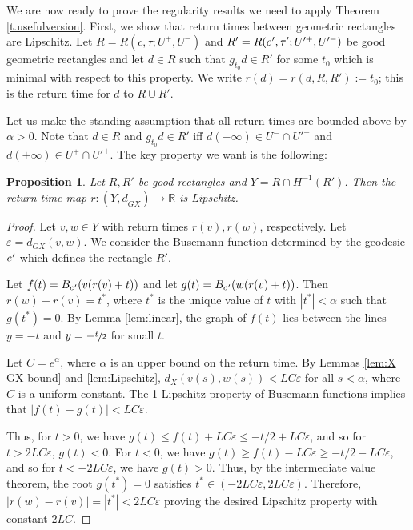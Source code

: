 \documentclass[11pt]{article}
\let\epsilon\varepsilon
\newcommand{\cpr}{c\mkern1mu'}
\newtheorem{prop}[thm]{Proposition}
\theoremstyle{definition}
\numberwithin{equation}{section}
\begin{document}
We are now ready to prove the regularity results we need to apply Theorem \ref{t.usefulversion}. First, we show that return times between geometric rectangles are Lipschitz. Let $R=R(c, \tau; U^+, U^-)$ and $R'=R(\cpr, \tau'; U'^+, U'^-)$ be good geometric rectangles and let $d\in R$ such that $g_{t_0}d \in R'$ for some $t_0$ which is minimal with respect to this property. We write $r(d)=r(d, R, R') :=t_0$; this is the return time for $d$ to $R \cup R'$.

Let us make the standing assumption that all return times are bounded above by $\alpha>0$. Note that $d\in R$ and $g_{t_0}d \in R'$ iff $d(-\infty)\in U^-\cap U'^-$ and $d(+\infty)\in U^+\cap U'^+$. The key property we want is the following:

\begin{prop}\label{prop:Lipschitz}
Let $R, R'$ be good rectangles and $Y= R \cap H^{-1}(R')$. Then the return time map $r:(Y, d_{G\tilde X}) \to \mathbb{R}$ is Lipschitz.
\end{prop}

\begin{proof}

Let $v,w \in Y$ with return times $r(v), r(w)$, respectively. Let $\epsilon = d_{GX}(v,w)$. We consider the Busemann function determined by the geodesic $\cpr$ which defines the rectangle $R'$.

Let $f(t) = B_{\cpr}(v(r(v)+t))$ and let $g(t) = B_{\cpr}(w(r(v)+t))$. Then $r(w)-r(v) = t^*$, where $t^*$ is the unique value of $t$ with $|t^\ast|< \alpha$ such that $g(t^\ast) = 0$. By Lemma \ref{lem:linear}, the graph of $f(t)$ lies between the lines $y=-t$ and $y=-\sfrac{t}{2}$ for small $t$.

Let $C = e^\alpha$, where $\alpha$ is an upper bound on the return time. By Lemmas \ref{lem:X GX bound} and \ref{lem:Lipschitz}, $d_X(v(s), w(s))<LC\epsilon$ for all $s<\alpha$, where $C$ is a uniform constant. The 1-Lipschitz property of Busemann functions implies that $|f(t)-g(t)| < LC\epsilon$.

Thus, for $t>0$, we have $g(t)\leq f(t)+LC \epsilon \leq -t/2 +LC\epsilon$, and so for $t>2LC \epsilon$, $g(t)<0$. For $t<0$, we have $g(t) \geq f(t)-LC \epsilon \geq -t/2-LC \epsilon$, and so for $t<-2LC \epsilon$, we have $g(t)>0$. Thus, by the intermediate value theorem, the root $g(t^\ast)=0$ satisfies $t^\ast \in (-2LC\epsilon, 2LC \epsilon)$. Therefore, $|r(w)-r(v)| = |t^\ast| < 2LC\epsilon$ proving the desired Lipschitz property with constant $2LC$.
\end{proof}
\end{document}
